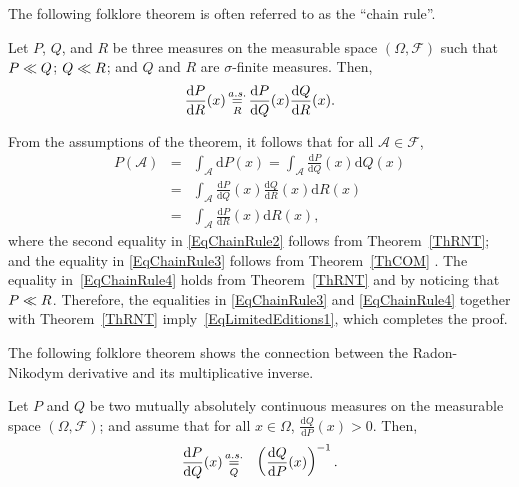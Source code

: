 \documentclass[lettersize,onecolumn]{IEEEtran}
\begin{document}
The following folklore theorem is often referred to as the ``chain rule''. 
 \begin{theorem}\label{TheoChainsAndBlood}
Let $P$, $Q$, and $R$ be three measures on the measurable space $\left( \Omega, \mathscr{F}\right)$ such that 
${P}\ll{Q}$; 
${Q}\ll{R}$; 
and $Q$ and $R$ are $\sigma$-finite measures.  
Then, 
\begin{equation}\label{EqLimitedEditions1}
\frac{\mathrm{d}P}{\mathrm{d}R}(x) \displaystyle\mathop{ \stackrel{a.s.}{=}}_{R} \frac{\mathrm{d}P}{\mathrm{d}Q}(x)  \frac{\mathrm{d}Q}{\mathrm{d}R}(x).
\end{equation}
\end{theorem}
%
\begin{IEEEproof}
From the assumptions of the theorem, it follows that for all $\mathcal{A} \in \mathscr{F}$, 
\begin{eqnarray}
\label{EqChainRule2}
P (\mathcal{A}) 
& = & \int_{\mathcal{A}} \mathrm{d} P(x) 
= \int_{\mathcal{A}} \frac{\mathrm{d} P}{\mathrm{d} Q}(x) \mathrm{d} Q(x)\\
\label{EqChainRule3}
& = &  \int_{\mathcal{A}} \frac{\mathrm{d} P}{\mathrm{d} Q}(x)\frac{\mathrm{d} Q}{\mathrm{d} R}(x) \mathrm{d} R(x)\\
\label{EqChainRule4} 
& = & \int_{\mathcal{A}} \frac{\mathrm{d} P}{\mathrm{d} R}(x) \mathrm{d} R(x),
\end{eqnarray}
where 
the second equality in \eqref{EqChainRule2} follows from Theorem~\ref{ThRNT}; and
the equality in \eqref{EqChainRule3} follows from Theorem~\ref{ThCOM} . 
%
The equality in~\eqref{EqChainRule4} holds from Theorem~\ref{ThRNT} and by noticing that ${P}\ll{R}$. 
%
Therefore, the equalities in \eqref{EqChainRule3} and \eqref{EqChainRule4} together with Theorem~\ref{ThRNT} imply~\eqref{EqLimitedEditions1}, which completes the proof.
\end{IEEEproof}
%
The following folklore theorem shows the connection between the Radon-Nikodym derivative and its multiplicative inverse.
%
\begin{theorem}\label{TheoInverseRND}
Let $P$ and $Q$ be two mutually absolutely continuous measures on the measurable space $\left( \Omega, \mathscr{F}\right)$; and assume that for all $x \in \Omega$,  $\frac{\mathrm{d}Q}{\mathrm{d}P}(x) > 0$. 
Then,  
\begin{eqnarray}\label{EqLimitedEditions}
\frac{\mathrm{d}P}{\mathrm{d}Q}(x) &  \displaystyle\mathop{ \stackrel{a.s.}{=}}_{Q} & \left( \frac{\mathrm{d}Q}{\mathrm{d}P}(x) \right)^{-1}.
\end{eqnarray}
\end{theorem}
\end{document}
